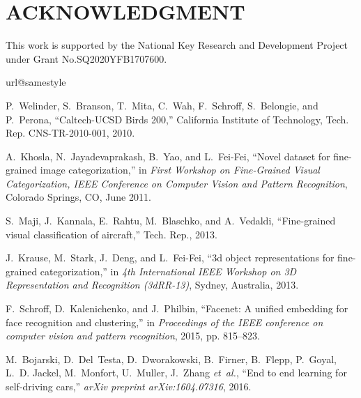\documentclass[conference]{IEEEtran}
\begin{document}
	\section*{ACKNOWLEDGMENT}
	This work is supported by the National Key Research and Development Project under Grant No.SQ2020YFB1707600.		   
\begin{thebibliography}{10}
\providecommand{\url}[1]{#1}
\csname url@samestyle\endcsname
\providecommand{\newblock}{\relax}
\providecommand{\bibinfo}[2]{#2}
\providecommand{\BIBentrySTDinterwordspacing}{\spaceskip=0pt\relax}
\providecommand{\BIBentryALTinterwordstretchfactor}{4}
\providecommand{\BIBentryALTinterwordspacing}{\spaceskip=\fontdimen2\font plus
\BIBentryALTinterwordstretchfactor\fontdimen3\font minus
  \fontdimen4\font\relax}
\providecommand{\BIBforeignlanguage}[2]{{\expandafter\ifx\csname l@#1\endcsname\relax
\typeout{** WARNING: IEEEtran.bst: No hyphenation pattern has been}\typeout{** loaded for the language `#1'. Using the pattern for}\typeout{** the default language instead.}\else
\language=\csname l@#1\endcsname
\fi
#2}}
\providecommand{\BIBdecl}{\relax}
\BIBdecl

P.~Welinder, S.~Branson, T.~Mita, C.~Wah, F.~Schroff, S.~Belongie, and
  P.~Perona, ``{Caltech-UCSD Birds 200},'' California Institute of Technology,
  Tech. Rep. CNS-TR-2010-001, 2010.

A.~Khosla, N.~Jayadevaprakash, B.~Yao, and L.~Fei-Fei, ``Novel dataset for
  fine-grained image categorization,'' in \emph{First Workshop on Fine-Grained
  Visual Categorization, IEEE Conference on Computer Vision and Pattern
  Recognition}, Colorado Springs, CO, June 2011.

S.~Maji, J.~Kannala, E.~Rahtu, M.~Blaschko, and A.~Vedaldi, ``Fine-grained
  visual classification of aircraft,'' Tech. Rep., 2013.

J.~Krause, M.~Stark, J.~Deng, and L.~Fei-Fei, ``3d object representations for
  fine-grained categorization,'' in \emph{4th International IEEE Workshop on 3D
  Representation and Recognition (3dRR-13)}, Sydney, Australia, 2013.

F.~Schroff, D.~Kalenichenko, and J.~Philbin, ``Facenet: A unified embedding for
  face recognition and clustering,'' in \emph{Proceedings of the IEEE
  conference on computer vision and pattern recognition}, 2015, pp. 815--823.

M.~Bojarski, D.~Del~Testa, D.~Dworakowski, B.~Firner, B.~Flepp, P.~Goyal, L.~D.
  Jackel, M.~Monfort, U.~Muller, J.~Zhang \emph{et~al.}, ``End to end learning
  for self-driving cars,'' \emph{arXiv preprint arXiv:1604.07316}, 2016.


\end{thebibliography}
\end{document}
